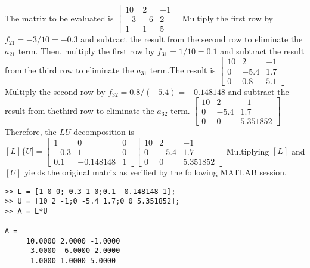 \documentclass[../main.tex]{subfiles}
\begin{document}
\section{}
The matrix to be evaluated is
\bigbreak
$\left[\begin{array}{ccc}
10 & 2 & -1 \\
-3 & -6 & 2 \\
1 & 1 & 5
\end{array}\right]$
\bigbreak
Multiply the first row by $f_{21}=-3 / 10=-0.3$ and subtract the result from the second row to eliminate the $a_{21}$ \smallbreak term. Then, multiply the first row by $f_{31}=1 / 10=0.1$ and subtract the result from the third row to eliminate the \smallbreak$a_{31}$ term.The result is
\bigbreak\bigbreak
$\left[\begin{array}{ccc}
10 & 2 & -1 \\
0 & -5.4 & 1.7 \\
0 & 0.8 & 5.1
\end{array}\right]$
\bigbreak\bigbreak
Multiply the second row by $f_{32}=0.8 /(-5.4)=-0.148148$ and subtract the result from the\smallbreak third row to eliminate the $a_{32}$ term.
\bigbreak\bigbreak
$\left[\begin{array}{ccc}
10 & 2 & -1 \\
0 & -5.4 & 1.7 \\
0 & 0 & 5.351852
\end{array}\right]$
\bigbreak
Therefore, the $L U$ decomposition is
\bigbreak\bigbreak
$[L]\{U]=\left[\begin{array}{ccc}
1 & 0 & 0 \\
-0.3 & 1 & 0 \\
0.1 & -0.148148 & 1
\end{array}\right]\left[\begin{array}{ccc}
10 & 2 & -1 \\
0 & -5.4 & 1.7 \\
0 & 0 & 5.351852
\end{array}\right]$
\bigbreak\bigbreak
Multiplying $[L]$ and $[U]$ yields the original matrix as verified by the following MATLAB session,
\bigbreak
\begin{lstlisting}[numbers=none]
>> L = [1 0 0;-0.3 1 0;0.1 -0.148148 1];
>> U = [10 2 -1;0 -5.4 1.7;0 0 5.351852];
>> A = L*U

A =
 	 10.0000 2.0000 -1.0000
	 -3.0000 -6.0000 2.0000
 	  1.0000 1.0000 5.0000
\end{lstlisting}
\end{document}
